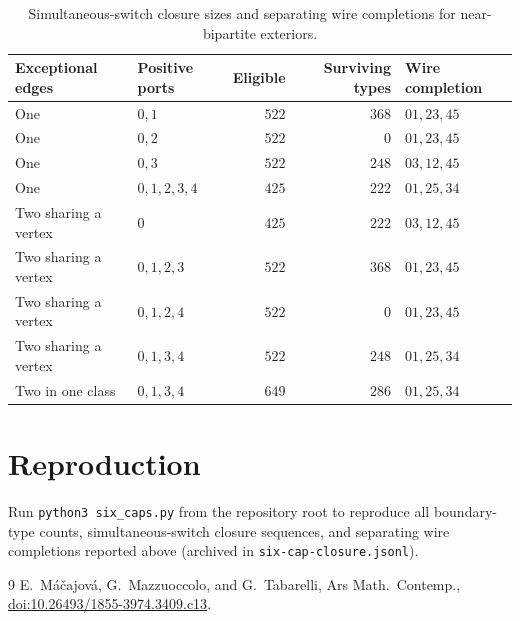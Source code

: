 \documentclass[11pt]{article}
\begin{document}
\begin{table}[ht]
\centering
\caption{Simultaneous-switch closure sizes and separating wire completions for near-bipartite exteriors.}
\label{tab:wires}
\begin{tabular}{@{}llrrl@{}}
\toprule
Exceptional edges & Positive ports & Eligible & Surviving types & Wire completion \\
\midrule
One & $0,1$         & $522$ & $368$ & $01,23,45$ \\
One & $0,2$         & $522$ & $0$   & $01,23,45$ \\
One & $0,3$         & $522$ & $248$ & $03,12,45$ \\
One & $0,1,2,3,4$   & $425$ & $222$ & $01,25,34$ \\
Two sharing a vertex & $0$         & $425$ & $222$ & $03,12,45$ \\
Two sharing a vertex & $0,1,2,3$   & $522$ & $368$ & $01,23,45$ \\
Two sharing a vertex & $0,1,2,4$   & $522$ & $0$   & $01,23,45$ \\
Two sharing a vertex & $0,1,3,4$   & $522$ & $248$ & $01,25,34$ \\
Two in one class     & $0,1,3,4$   & $649$ & $286$ & $01,25,34$ \\
\bottomrule
\end{tabular}
\end{table}

\section{Reproduction}

Run \texttt{python3 six\_caps.py} from the repository root to reproduce all boundary-type
counts, simultaneous-switch closure sequences, and separating wire completions reported
above (archived in \texttt{six-cap-closure.jsonl}).

\begin{thebibliography}{9}
E.~M\'{a}\v{c}ajov\'{a}, G.~Mazzuoccolo, and G.~Tabarelli,
Ars Math.\ Contemp., \href{https://doi.org/10.26493/1855-3974.3409.c13}{doi:10.26493/1855-3974.3409.c13}.
\end{thebibliography}
\end{document}
